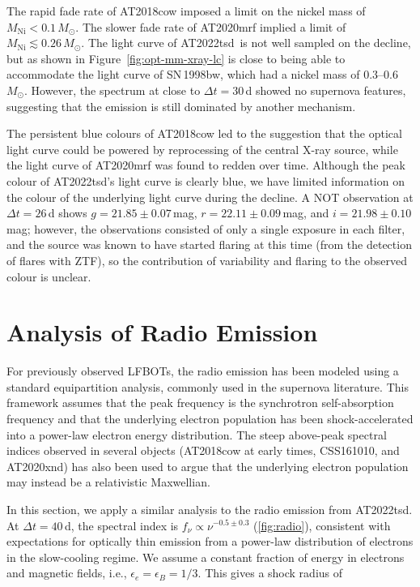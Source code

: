 \documentclass{nature_plusfigure}
\newcommand{\at}{AT2022tsd}
\begin{document}
\begin{methods}
The rapid fade rate of AT2018cow imposed a limit on the nickel mass\cite{Perley2019,Margutti2019} of $M_\mathrm{Ni}<0.1\,M_\odot$. The slower fade rate of AT2020mrf implied\cite{Yao2022} a limit of $M_\mathrm{Ni}\lesssim 0.26\,M_\odot$. The light curve of \at\ is not well sampled on the decline, but as shown in Figure~\ref{fig:opt-mm-xray-lc} is close to being able to accommodate the light curve of SN\,1998bw, which had\cite{Cano2017} a nickel mass of 0.3--0.6\,$M_\odot$. However, the spectrum at close to $\Delta t=30$\,d showed no supernova features, suggesting that the emission is still dominated by another mechanism.

The persistent blue colours of AT2018cow led to the suggestion that the optical light curve could be powered by reprocessing of the central X-ray source\cite{Margutti2019}, while the light curve of AT2020mrf was found to redden over time\cite{Yao2022}. Although the peak colour of \at's light curve is clearly blue, we have limited information on the colour of the underlying light curve during the decline. A NOT observation at $\Delta t=26\,$d shows $g=21.85\pm0.07\,$mag, $r=22.11\pm0.09\,$mag, and $i=21.98\pm0.10\,$mag; however, the observations consisted of only a single exposure in each filter, and the source was known to have started flaring at this time (from the detection of flares with ZTF), so the contribution of variability and flaring to the observed colour is unclear.

\section{Analysis of Radio Emission}
\label{sec:radio-analysis}

For previously observed LFBOTs, the radio emission has been modeled using a standard equipartition analysis, commonly used in the supernova literature\cite{Chevalier1998}. This framework assumes that the peak frequency is the synchrotron self-absorption frequency\cite{Ho2019,Margutti2019,Coppejans2020,Ho2022_AT2020xnd,Bright2022,Yao2022} and that the underlying electron population has been shock-accelerated into a power-law electron energy distribution. The steep above-peak spectral indices observed in several objects (AT2018cow at early times\cite{Ho2019}, CSS161010\cite{Coppejans2020}, and AT2020xnd\cite{Ho2022_AT2020xnd}) has also been used to argue that the underlying electron population may instead be a relativistic Maxwellian\cite{Margalit2021}.

In this section, we apply a similar analysis to the radio emission from \at. At $\Delta t=40\,$d, the spectral index is $f_\nu \propto \nu^{-0.5\pm0.3}$ (\ref{fig:radio}), consistent with expectations for optically thin emission from a power-law distribution of electrons in the slow-cooling regime. We assume a constant fraction of energy in electrons and magnetic fields, i.e., $\epsilon_e=\epsilon_B=1/3$. This gives a shock radius of\cite{Chevalier1998}


\end{methods}
\end{document}
